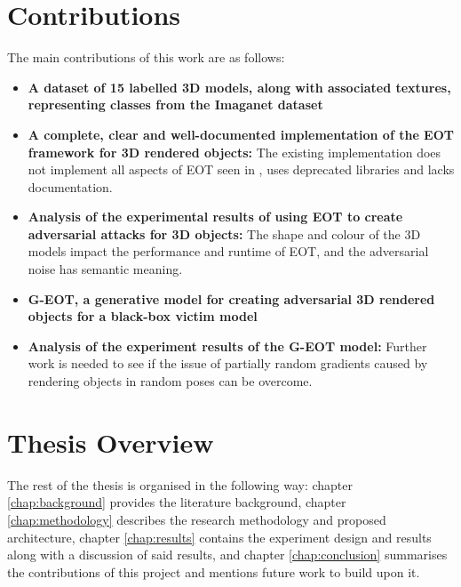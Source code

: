 \section{Contributions} 
	\label{sec:intro_contribs} 
	
	The main contributions of this work are as follows:
	
	\begin{itemize}
	    
	    \item \textbf{A dataset of 15 labelled 3D models, along with associated textures, representing classes from the Imaganet dataset}
		
		\item \textbf{A complete, clear and well-documented implementation of the EOT framework \cite{athalye} for 3D rendered objects:} The existing implementation does not implement all aspects of EOT seen in \cite{athalye}, uses deprecated libraries and lacks documentation.
		
		\item \textbf{Analysis of the experimental results of using EOT to create adversarial attacks for 3D objects:} The shape and colour of the 3D models impact the performance and runtime of EOT, and the adversarial noise has semantic meaning.
		
		\item \textbf{G-EOT, a generative model for creating adversarial 3D rendered objects for a black-box victim model}
		
		\item \textbf{Analysis of the experiment results of the G-EOT model:} Further work is needed to see if the issue of partially random gradients caused by rendering objects in random poses can be overcome.
			
	\end{itemize}
	
\section{Thesis Overview}

The rest of the thesis is organised in the following way: chapter \ref{chap:background} provides the literature background, chapter \ref{chap:methodology} describes the research methodology and proposed architecture, chapter \ref{chap:results} contains the experiment design and results along with a discussion of said results, and chapter \ref{chap:conclusion} summarises the contributions of this project and mentions future work to build upon it.

